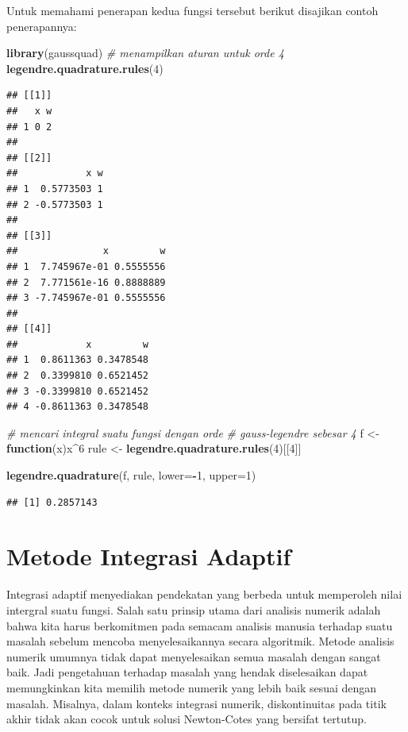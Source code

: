 \documentclass[]{book}
\newenvironment{Shaded}{\begin{snugshade}}{\end{snugshade}}
\newcommand{\CommentTok}[1]{\textcolor[rgb]{0.56,0.35,0.01}{\textit{#1}}}
\newcommand{\ControlFlowTok}[1]{\textcolor[rgb]{0.13,0.29,0.53}{\textbf{#1}}}
\newcommand{\DataTypeTok}[1]{\textcolor[rgb]{0.13,0.29,0.53}{#1}}
\newcommand{\DecValTok}[1]{\textcolor[rgb]{0.00,0.00,0.81}{#1}}
\newcommand{\KeywordTok}[1]{\textcolor[rgb]{0.13,0.29,0.53}{\textbf{#1}}}
\newcommand{\NormalTok}[1]{#1}
\newcommand{\OperatorTok}[1]{\textcolor[rgb]{0.81,0.36,0.00}{\textbf{#1}}}
\newcommand{\StringTok}[1]{\textcolor[rgb]{0.31,0.60,0.02}{#1}}
\theoremstyle{definition}
\theoremstyle{definition}
\theoremstyle{definition}
\theoremstyle{remark}
\begin{document}
Untuk memahami penerapan kedua fungsi tersebut berikut disajikan contoh penerapannya:

\begin{Shaded}
\begin{Highlighting}[]
\KeywordTok{library}\NormalTok{(gaussquad)}
\CommentTok{# menampilkan aturan untuk orde 4}
\KeywordTok{legendre.quadrature.rules}\NormalTok{(}\DecValTok{4}\NormalTok{)}
\end{Highlighting}
\end{Shaded}

\begin{verbatim}
## [[1]]
##   x w
## 1 0 2
## 
## [[2]]
##            x w
## 1  0.5773503 1
## 2 -0.5773503 1
## 
## [[3]]
##               x         w
## 1  7.745967e-01 0.5555556
## 2  7.771561e-16 0.8888889
## 3 -7.745967e-01 0.5555556
## 
## [[4]]
##            x         w
## 1  0.8611363 0.3478548
## 2  0.3399810 0.6521452
## 3 -0.3399810 0.6521452
## 4 -0.8611363 0.3478548
\end{verbatim}

\begin{Shaded}
\begin{Highlighting}[]
\CommentTok{# mencari integral suatu fungsi dengan orde}
\CommentTok{# gauss-legendre sebesar 4}
\NormalTok{f <-}\StringTok{ }\ControlFlowTok{function}\NormalTok{(x)x}\OperatorTok{^}\DecValTok{6}
\NormalTok{rule <-}\StringTok{ }\KeywordTok{legendre.quadrature.rules}\NormalTok{(}\DecValTok{4}\NormalTok{)[[}\DecValTok{4}\NormalTok{]]}

\KeywordTok{legendre.quadrature}\NormalTok{(f, rule, }\DataTypeTok{lower=}\OperatorTok{-}\DecValTok{1}\NormalTok{, }\DataTypeTok{upper=}\DecValTok{1}\NormalTok{)}
\end{Highlighting}
\end{Shaded}

\begin{verbatim}
## [1] 0.2857143
\end{verbatim}

\hypertarget{adaptifint}{%
\section{Metode Integrasi Adaptif}\label{adaptifint}}

Integrasi adaptif menyediakan pendekatan yang berbeda untuk memperoleh nilai intergral suatu fungsi. Salah satu prinsip utama dari analisis numerik adalah bahwa kita harus berkomitmen pada semacam analisis manusia terhadap suatu masalah sebelum mencoba menyelesaikannya secara algoritmik. Metode analisis numerik umumnya tidak dapat menyelesaikan semua masalah dengan sangat baik. Jadi pengetahuan terhadap masalah yang hendak diselesaikan dapat memungkinkan kita memilih metode numerik yang lebih baik sesuai dengan masalah. Misalnya, dalam konteks integrasi numerik, diskontinuitas pada titik akhir tidak akan cocok untuk solusi Newton-Cotes yang bersifat tertutup.
\end{document}
